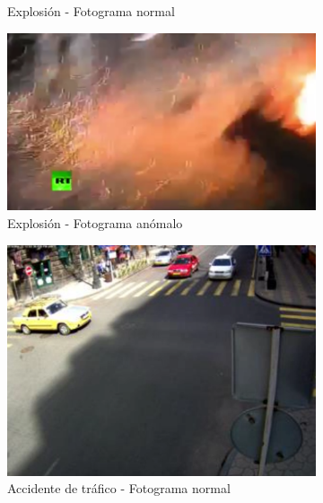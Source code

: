 \documentclass[../main.tex]{memoir}
\begin{document}
\begin{figure}[hbtp]
\begin{subfigure}{0.48\textwidth}
    \caption{Explosión - Fotograma normal}
  \end{subfigure}
  \begin{subfigure}{0.48\textwidth}
    \centering
    \includegraphics[width=\linewidth]{images/ucf-examples/explosion-abnormal}
    \caption{Explosión - Fotograma anómalo}
  \end{subfigure}
  \begin{subfigure}{0.48\textwidth}
    \centering
    \includegraphics[width=\linewidth]{images/ucf-examples/roadaccident-normal}
    \caption{Accidente de tráfico - Fotograma normal}
  \end{subfigure}
  \begin{subfigure}{0.48\textwidth}
    \centering

\end{subfigure}
\end{figure}
\end{document}
